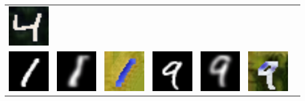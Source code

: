 \documentclass[landscape,a0paper,fontscale=0.285]{baposter} %
\begin{document}
\begin{poster}
{\begin{minipage}[t]{.35\linewidth}
\begin{tabular}{ccccccc}
\includegraphics[width=.16\textwidth]{figures/mnist/2_fake_B.jpg} \\
\includegraphics[width=.16\textwidth]{figures/mnist/3_real_A.jpg}&
\includegraphics[width=.16\textwidth]{figures/mnist/3_fake_B-1.jpg}&
\includegraphics[width=.16\textwidth]{figures/mnist/3_fake_B.jpg}&
\includegraphics[width=.16\textwidth]{figures/mnist/4_real_A.jpg}&
\includegraphics[width=.16\textwidth]{figures/mnist/4_fake_B-1.jpg}&
\includegraphics[width=.16\textwidth]{figures/mnist/4_fake_B.jpg} \\
\end{tabular}
\end{minipage}
\hspace{.85cm}
\begin{minipage}[t]{.65\linewidth}

\end{minipage}}
\end{poster}
\end{document}
